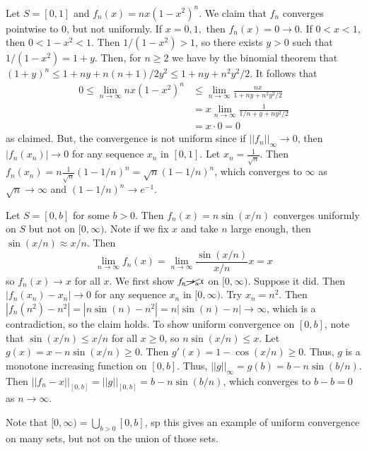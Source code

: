 \begin{example}
    Let $S = [0,1]$ and $f_n(x) = nx(1-x^2)^n$. We claim that $f_n$ converges pointwise to $0$, but not uniformly. If $x = 0,1,$ then $f_n(x) = 0\rightarrow 0$. If $0 < x < 1$, then $0 < 1-x^2 < 1$. Then $1/(1-x^2) > 1$, so there exists $y > 0$ such that $1/(1-x^2) = 1+y$. Then, for $n \geq 2$ we have by the binomial theorem that $(1+y)^n \leq 1 + ny + n(n+1)/2y^2 \leq 1 +ny + n^2y^2/2$. It follows that \begin{align*}
        0 \leq \lim\limits_{n\rightarrow \infty}nx(1-x^2)^n &\leq \lim\limits_{n\rightarrow \infty}\frac{nx}{1+ny+n^2y^2/2} \tag{for some $y > 0$} \\
        &= x\lim\limits_{n\rightarrow \infty}\frac{1}{1/n+y+ny^2/2} \\
        &= x\cdot 0 = 0
    \end{align*}
    as claimed. But, the convergence is not uniform since if $||f_n||_{\infty}\rightarrow 0$, then $|f_n(x_n)|\rightarrow 0$ for any sequence $x_n$ in $[0,1]$. Let $x_n = \frac{1}{\sqrt{n}}$. Then $f_n(x_n) = n\frac{1}{\sqrt{n}}(1-1/n)^n = \sqrt{n}(1-1/n)^n$, which converges to $\infty$ as $\sqrt{n}\rightarrow \infty$ and $(1-1/n)^n\rightarrow e^{-1}$.
\end{example}

\begin{example}
    Let $S = [0,b]$ for some $b > 0$. Then $f_n(x) = n\sin(x/n)$ converges uniformly on $S$ but not on $[0,\infty)$. Note if we fix $x$ and take $n$ large enough, then $\sin(x/n) \approx x/n$. Then $$\lim\limits_{n\rightarrow \infty}f_n(x) = \lim\limits_{n\rightarrow \infty}\frac{\sin(x/n)}{x/n}x = x$$ so $f_n(x)\rightarrow x$ for all $x$. We first show $f_n\cancel{\rightarrow_u} x$ on $[0,\infty)$. Suppose it did. Then $|f_n(x_n)-x_n|\rightarrow 0$ for any sequence $x_n$ in $[0,\infty)$. Try $x_n = n^2$. Then $|f_n(n^2) - n^2| = |n\sin(n)-n^2| = n|\sin(n) - n|\rightarrow \infty$, which is a contradiction, so the claim holds. To show uniform convergence on $[0,b]$, note that $\sin(x/n) \leq x/n$ for all $x \geq 0$, so $n\sin(x/n) \leq x$. Let $g(x) = x-n\sin(x/n) \geq 0$. Then $g'(x) = 1-\cos(x/n) \geq 0$. Thus, $g$ is a monotone increasing function on $[0,b]$. Thus, $||g||_{\infty} = g(b) = b-n\sin(b/n)$. Then $||f_n - x||_{[0,b]} = ||g||_{[0,b]} = b-n\sin(b/n)$, which converges to $b-b = 0$ as $n\rightarrow \infty$.
\end{example}

Note that $[0,\infty) = \bigcup_{b > 0}[0,b]$, sp this gives an example of uniform convergence on many sets, but not on the union of those sets.





